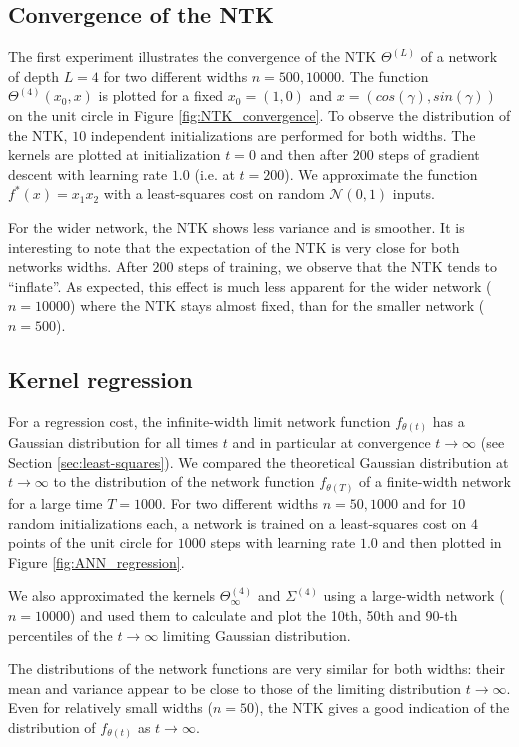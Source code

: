 \documentclass{article}
\begin{document}
\subsection{Convergence of the NTK}
The first experiment illustrates the convergence of the NTK $\Theta^{(L)}$ of a network of depth $L=4$ for two different widths $n=500, 10000$. The function $\Theta^{(4)}(x_0, x)$ is plotted for a fixed $x_0=(1, 0)$ and $x=(cos(\gamma), sin(\gamma))$ on the unit circle in Figure \ref{fig:NTK_convergence}. To observe the distribution of the NTK, $10$ independent initializations are performed for both widths. The kernels are plotted at initialization $t=0$ and then after $200$ steps of gradient descent with learning rate $1.0$ (i.e. at $t=200$). We approximate the function $f^*(x) = x_1 x_2$ with a least-squares cost on random $\mathcal{N}(0, 1)$ inputs.

For the wider network, the NTK shows less variance and is smoother. It is interesting to note that the expectation of the NTK is very close for both networks widths. After $200$ steps of training, we observe that the NTK tends to ``inflate''. As expected, this effect is much less apparent for the wider network ($n=10000$) where the NTK stays almost fixed, than for the smaller network ($n=500$).

\subsection{Kernel regression}
For a regression cost, the infinite-width limit network function $f_{\theta(t)}$ has a Gaussian distribution for all times $t$ and in particular at convergence $t\to \infty $ (see Section \ref{sec:least-squares}). We compared the theoretical Gaussian distribution at $t\to\infty$ to the distribution of the network function $f_{\theta(T)}$ of a finite-width network for a large time $T=1000$. For two different widths $n=50, 1000$ and for $10$ random initializations each, a network is trained on a least-squares cost on $4$ points of the unit circle for $1000$ steps with learning rate $1.0$ and then plotted in Figure \ref{fig:ANN_regression}.

We also approximated the kernels $\Theta_\infty^{(4)}$ and $\Sigma^{(4)}$ using a large-width network ($n=10000$) and used them to calculate and plot the 10th, 50th and 90-th percentiles of the $t\to \infty$ limiting Gaussian distribution.

The distributions of the network functions are very similar for both widths: their mean and variance appear to be close to those of the limiting distribution $t \to \infty$. Even for relatively small widths ($n=50$), the NTK gives a good indication of the distribution of $f_{\theta(t)}$ as $t\to\infty$.
\end{document}
